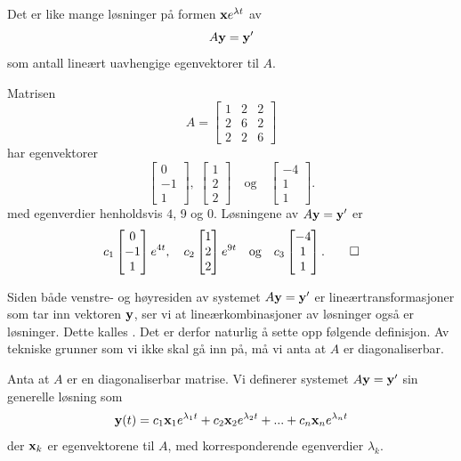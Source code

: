 \begin{thm}
Det er like mange løsninger på formen $\mathbf{x} e^{\lambda t}$ av 
\[
A\mathbf{y}=\mathbf{y}'
\]
som antall lineært uavhengige egenvektorer til $A$.
\end{thm}



\begin{ex}
Matrisen
\[
A=
\begin{bmatrix}
1 & 2 & 2\\  2 &6 & 2 \\ 2 & 2 & 6
\end{bmatrix}
\]
har egenvektorer 
\[
\begin{bmatrix}
0 \\ -1 \\ 1
\end{bmatrix},
\;
\begin{bmatrix}
1 \\ 2 \\ 2
\end{bmatrix}
\quad \text{og} \quad
\begin{bmatrix}
-4 \\ 1 \\ 1
\end{bmatrix}.
\]
med egenverdier henholdsvis $4$, 9 og $0$. Løsningene av $A\mathbf{y}=\mathbf{y}'$ er 
\[
c_1
\begin{bmatrix}
0 \\ -1 \\ 1
\end{bmatrix} e^{4t}, \quad
c_2
\begin{bmatrix}
1 \\ 2 \\ 2
\end{bmatrix}e^{9t}
\quad \text{og} \quad
c_3
\begin{bmatrix}
-4 \\ 1 \\ 1
\end{bmatrix}. \qedhere
\]
\end{ex}

Siden både venstre- og høyresiden av systemet $A\mathbf{y}=\mathbf{y}'$ er lineærtransformasjoner som tar inn vektoren $\mathbf{y}$, 
ser vi at lineærkombinasjoner av løsninger også er løsninger.  Dette kalles .
Det er derfor naturlig å sette opp følgende definisjon. Av tekniske grunner som vi ikke skal gå inn på, må vi anta at $A$ er diagonaliserbar.

\begin{defnx}
Anta at $A$ er en diagonaliserbar matrise. Vi definerer systemet $A\mathbf{y}=\mathbf{y}'$ sin generelle løsning som 
\[
\mathbf{y}(t)=c_1\mathbf{x}_1e^{\lambda_1 t}+c_2\mathbf{x}_2e^{\lambda_2 t}+...+c_n\mathbf{x}_ne^{\lambda_n t}
\]
der $\mathbf{x}_k$ er egenvektorene til $A$, med korresponderende egenverdier $\lambda_k$.
\end{defnx}

